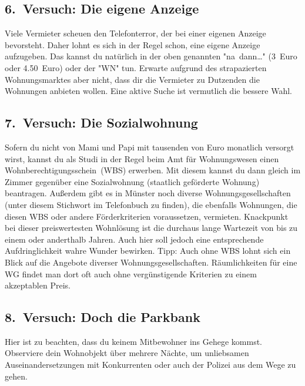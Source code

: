 \begin{multicols*}{2}
\subsection{6.~Versuch: Die eigene Anzeige}
Viele Vermieter scheuen den Telefonterror, der bei einer eigenen Anzeige bevorsteht.
Daher lohnt es sich in der Regel schon, eine eigene Anzeige aufzugeben.
Das kannst du natürlich in der oben genannten "na~dann\dots" (3~Euro oder \num{4,50}~Euro) oder der "WN" tun.
Erwarte aufgrund des strapazierten Wohnungsmarktes aber nicht, dass dir die Vermieter zu Dutzenden die Wohnungen anbieten wollen.
Eine aktive Suche ist vermutlich die bessere Wahl.

\subsection{7.~Versuch: Die Sozialwohnung}
Sofern du nicht von Mami und Papi mit tausenden von Euro monatlich versorgt wirst, kannst du als Studi in der Regel beim Amt für Wohnungswesen einen Wohnberechtigungsschein~(WBS) erwerben.
Mit diesem kannst du dann gleich im Zimmer gegenüber eine Sozialwohnung (staatlich geförderte Wohnung) beantragen.
Außerdem gibt es in Münster noch diverse Wohnungsgesellschaften (unter diesem Stichwort im Telefonbuch zu finden), die ebenfalls Wohnungen, die diesen WBS oder andere Förderkriterien voraussetzen, vermieten.
Knackpunkt bei dieser preiswertesten Wohnlösung ist die durchaus lange Wartezeit von bis zu einem oder anderthalb Jahren.
Auch hier soll jedoch eine entsprechende Aufdringlichkeit wahre Wunder bewirken.
Tipp: Auch ohne WBS lohnt sich ein Blick auf die Angebote diverser Wohnungsgesellschaften.
Räumlichkeiten für eine WG findet man dort oft auch ohne vergünstigende Kriterien zu einem akzeptablen Preis.

\subsection{8.~Versuch: Doch die Parkbank}
Hier ist zu beachten, dass du keinem Mitbewohner ins Gehege kommst.
Observiere dein Wohnobjekt über mehrere Nächte, um unliebsamen Auseinandersetzungen mit Konkurrenten oder auch der Polizei aus dem Wege zu gehen.


\end{multicols*}
